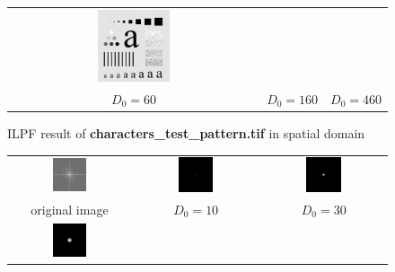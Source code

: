 \documentclass[11pt,a4paper]{article}
\begin{document}
\begin{figure}[!htbp]
\begin{tabular}{ccc}
		\includegraphics[width=0.3\textwidth]{pro3/ILPF/ILPF_460} \\
		 $D_0=60$ &  $D_0=160$ &  $D_0=460$
	\end{tabular}
	\caption{ILPF result of \textbf{characters\_test\_pattern.tif} in spatial domain}
	\label{pro3_fig1}
\end{figure}

\begin{figure}[!htbp]
	\centering
	\begin{tabular}{ccc} 
		\includegraphics[width=0.3\textwidth]{pro3/org_spectrum}&
		\includegraphics[width=0.3\textwidth]{pro3/ILPF/ILPF_10_spectrum}&
		\includegraphics[width=0.3\textwidth]{pro3/ILPF/ILPF_30_spectrum} \\
		original image &  $D_0=10$ &  $D_0=30$\\
		\includegraphics[width=0.3\textwidth]{pro3/ILPF/ILPF_60_spectrum}&

\end{tabular}
\end{figure}
\end{document}
